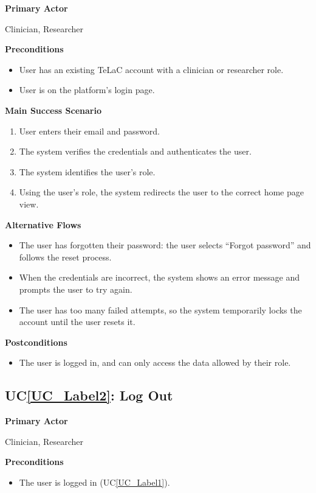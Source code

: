 \documentclass[12pt]{article}
\newcounter{ucnum} %
\newcommand{\ucref}[1]{UC\ref{#1}}
\begin{document}
\textbf{Primary Actor}

Clinician, Researcher

\textbf{Preconditions}
\begin{itemize}
\item User has an existing TeLaC account with a clinician or researcher
  role.
\item User is on the platform's login page.
\end{itemize}

\textbf{Main Success Scenario}
\begin{enumerate}
\item User enters their email and password.
\item The system verifies the credentials and authenticates the user.
\item The system identifies the user's role.
\item Using the user's role, the system redirects the user to the correct home page view.
\end{enumerate}

\textbf{Alternative Flows}
\begin{itemize}
\item[1a.] The user has forgotten their password: the user selects ``Forgot
  password'' and follows the reset process.
\item[2a.] When the credentials are incorrect, the system shows an error message and
  prompts the user to try again.
\item[2b.] The user has too many failed attempts, so the system temporarily locks
  the account until the user resets it.
\end{itemize}

\textbf{Postconditions}
\begin{itemize}
\item The user is logged in, and can only access the data allowed by their role.
\end{itemize}

 \label{UC_Label2}
\subsection{\ucref{UC_Label2}: Log Out}

\textbf{Primary Actor}

Clinician, Researcher

\textbf{Preconditions}
\begin{itemize}
\item The user is logged in (\ucref{UC_Label1}).
\end{itemize}
\end{document}

